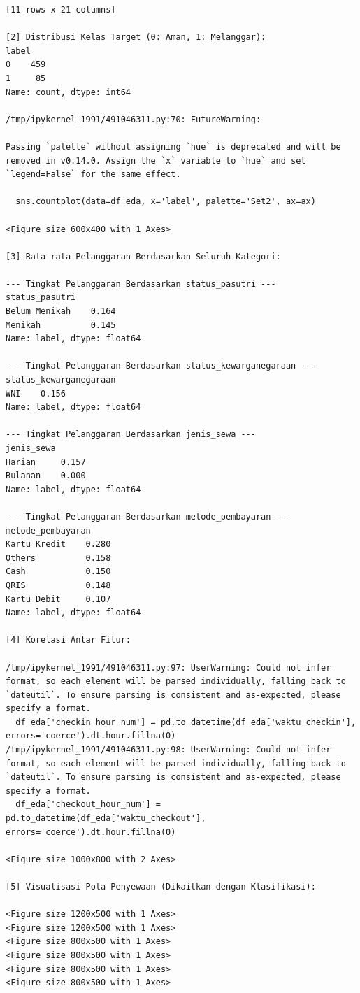 \begin{lstlisting}[caption={Output 18}]
[11 rows x 21 columns]

[2] Distribusi Kelas Target (0: Aman, 1: Melanggar):
label
0    459
1     85
Name: count, dtype: int64

/tmp/ipykernel_1991/491046311.py:70: FutureWarning: 

Passing `palette` without assigning `hue` is deprecated and will be removed in v0.14.0. Assign the `x` variable to `hue` and set `legend=False` for the same effect.

  sns.countplot(data=df_eda, x='label', palette='Set2', ax=ax)

<Figure size 600x400 with 1 Axes>

[3] Rata-rata Pelanggaran Berdasarkan Seluruh Kategori:

--- Tingkat Pelanggaran Berdasarkan status_pasutri ---
status_pasutri
Belum Menikah    0.164
Menikah          0.145
Name: label, dtype: float64

--- Tingkat Pelanggaran Berdasarkan status_kewarganegaraan ---
status_kewarganegaraan
WNI    0.156
Name: label, dtype: float64

--- Tingkat Pelanggaran Berdasarkan jenis_sewa ---
jenis_sewa
Harian     0.157
Bulanan    0.000
Name: label, dtype: float64

--- Tingkat Pelanggaran Berdasarkan metode_pembayaran ---
metode_pembayaran
Kartu Kredit    0.280
Others          0.158
Cash            0.150
QRIS            0.148
Kartu Debit     0.107
Name: label, dtype: float64

[4] Korelasi Antar Fitur:

/tmp/ipykernel_1991/491046311.py:97: UserWarning: Could not infer format, so each element will be parsed individually, falling back to `dateutil`. To ensure parsing is consistent and as-expected, please specify a format.
  df_eda['checkin_hour_num'] = pd.to_datetime(df_eda['waktu_checkin'], errors='coerce').dt.hour.fillna(0)
/tmp/ipykernel_1991/491046311.py:98: UserWarning: Could not infer format, so each element will be parsed individually, falling back to `dateutil`. To ensure parsing is consistent and as-expected, please specify a format.
  df_eda['checkout_hour_num'] = pd.to_datetime(df_eda['waktu_checkout'], errors='coerce').dt.hour.fillna(0)

<Figure size 1000x800 with 2 Axes>

[5] Visualisasi Pola Penyewaan (Dikaitkan dengan Klasifikasi):

<Figure size 1200x500 with 1 Axes>
<Figure size 1200x500 with 1 Axes>
<Figure size 800x500 with 1 Axes>
<Figure size 800x500 with 1 Axes>
<Figure size 800x500 with 1 Axes>
<Figure size 800x500 with 1 Axes>


\end{lstlisting}
